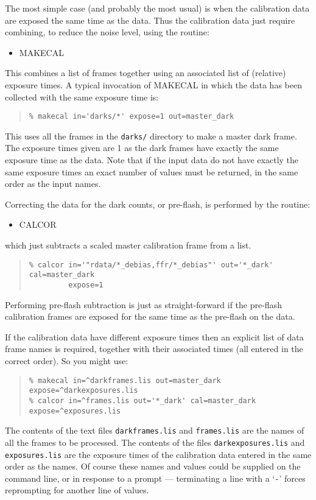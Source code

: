 \documentclass[twoside,11pt]{article}
\newcommand{\htmlref}[2]{#1}
\newcommand{\latexhtml}[2]{#1}
\renewcommand{\_}{\texttt{\symbol{95}}}
\newcommand{\ttsize}{\latexhtml{\small}{}}
\newenvironment{myquote}{\begin{quote}\ttsize}{\end{quote}}
\newcommand{\text}[1]{{\ttsize \tt #1}}
\newcommand{\routine}[1]{{\sc #1}}
\newcommand{\xroutine}[1]{\htmlref{{\sc #1}}{#1}}
\begin{document}
The most simple case (and probably the most usual) is when the
calibration data are exposed the same time as the data. Thus the
calibration data just require combining, to reduce the noise level,
using the routine:
\begin{itemize}
\item \xroutine{MAKECAL}
\end{itemize}
This combines a list of frames together using an associated list
of (relative) exposure times. A typical invocation of \routine{MAKECAL} in which
the data has been collected with the same exposure time is:
\begin{myquote}
\begin{verbatim}
% makecal in='darks/*' expose=1 out=master_dark
\end{verbatim}
\end{myquote}
This uses all the frames in the \text{darks/} directory to make a
master dark frame. The exposure times given are 1 as the dark frames
have exactly the same exposure time as the data. Note that if the input
data do not have exactly the same exposure times an exact number of
values must be returned, in the same order as the input names.

Correcting the data for the dark counts, or pre-flash, is performed by
the routine:
\begin{itemize}
\item \xroutine{CALCOR}
\end{itemize}
which just subtracts a scaled master calibration frame from a list.
\begin{myquote}
\begin{verbatim}
% calcor in='"rdata/*_debias,ffr/*_debias"' out='*_dark' cal=master_dark
         expose=1
\end{verbatim}
\end{myquote}

Performing pre-flash subtraction is just as straight-forward if the
pre-flash calibration frames are exposed for the same time as the
pre-flash on the data.

If the calibration data have different exposure times then an explicit
list of data frame names is required, together with their associated
times (all entered in the correct order). So you might use:
\begin{myquote}
\begin{verbatim}
% makecal in=^darkframes.lis out=master_dark expose=^darkexposures.lis
% calcor in=^frames.lis out='*_dark' cal=master_dark expose=^exposures.lis
\end{verbatim}
\end{myquote}
The contents of the text files \text{darkframes.lis} and
\text{frames.lis} are the names of all the frames to be
processed. The contents of the files \text{darkexposures.lis} and
\text{exposures.lis}  are the exposure times of the calibration
data entered in the same order as the names. Of course these names and
values could be supplied on the command line, or in response to a
prompt --- terminating a line with a `\text{-}' forces reprompting
for another line of values.
\end{document}
